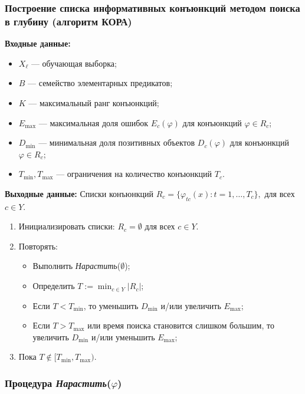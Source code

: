 \subsubsection{Построение списка информативных конъюнкций методом поиска в глубину (алгоритм КОРА)}

\textbf{Входные данные:}
\begin{itemize}
    \item \(X_\ell\) — обучающая выборка;
    \item \(B\) — семейство элементарных предикатов;
    \item \(K\) — максимальный ранг конъюнкций;
    \item \(E_{\text{max}}\) — максимальная доля ошибок \(E_c(\varphi)\) для конъюнкций \(\varphi \in R_c\);
    \item \(D_{\text{min}}\) — минимальная доля позитивных объектов \(D_c(\varphi)\) для конъюнкций \(\varphi \in R_c\);
    \item \(T_{\text{min}}, T_{\text{max}}\) — ограничения на количество конъюнкций \(T_c\).
\end{itemize}

\textbf{Выходные данные:} 
Списки конъюнкций \(R_c = \{ \varphi_{tc}(x) : t = 1, \dots, T_c \}, \) для всех \(c \in Y\).

\begin{enumerate}
    \item Инициализировать списки: \(R_c = \emptyset\) для всех \(c \in Y\).
    \item Повторять:
    \begin{itemize}
        \item Выполнить \textit{Нарастить}(\(\emptyset\));
        \item Определить \(T := \min_{c \in Y} |R_c|\);
        \item Если \(T < T_{\text{min}}\), то уменьшить \(D_{\text{min}}\) и/или увеличить \(E_{\text{max}}\);
        \item Если \(T > T_{\text{max}}\) или время поиска становится слишком большим, то увеличить \(D_{\text{min}}\) и/или уменьшить \(E_{\text{max}}\);
    \end{itemize}
    \item Пока \(T \notin [T_{\text{min}}, T_{\text{max}})\).
\end{enumerate}

\subsubsection{Процедура \textit{Нарастить}(\(\varphi\))}

